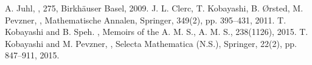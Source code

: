 \documentclass[11pt,a4paper,twoside]{jarticle}
\newcommand{\研究課題名}{Symmetry breaking operators}
\newcommand{\研究機関名}{東京大学}
\newcommand{\申請者氏名}{レオンチエフ\,オレクシィ}
\newcommand{\研究代表者氏名}{\申請者氏名}
\newcommand{\研究期間の最終元号年度}{31}	%
\begin{document}
{	\begin{thebibliography}{99}
  A. Juhl, , 275, Birkh\"auser Basel, 2009.
J. L. Clerc, T. Kobayashi, B. {{\O}}rsted, M. Pevzner, , Mathematische Annalen, Springer, 349(2), pp. 395--431, 2011.
	  T. Kobayashi and B. Speh. ,
	Memoirs of the A. M. S., A. M. S., 238(1126), 2015. 
T. Kobayashi and M. Pevzner, , Selecta Mathematica (N.S.), Springer, 22(2), 
		pp. 847--911, 2015.
	\end{thebibliography}
}
\end{document}
